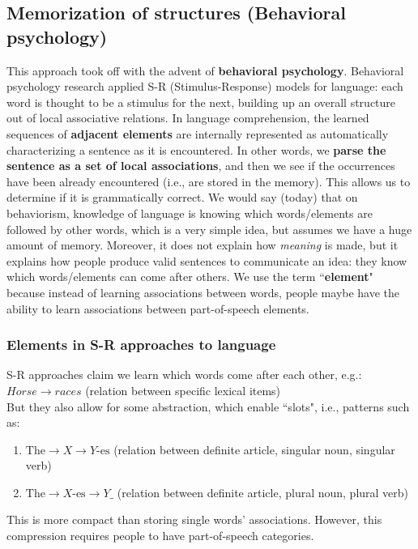 \subsection{Memorization of structures (Behavioral psychology)}
This approach took off with the advent of \textbf{behavioral psychology}.
Behavioral psychology research applied S-R (Stimulus-Response) models for language: each word is thought to be a stimulus for the next, building up an overall structure out of local associative relations.
In language comprehension, the learned sequences of \textbf{adjacent elements} are internally represented as automatically characterizing a sentence as it is encountered. In other words, we \textbf{parse the sentence as a set of local associations}, and then we see if the occurrences have been already encountered (i.e., are stored in the memory). This allows us to determine if it is grammatically correct. We would say (today) that on behaviorism, knowledge of language is 
knowing which words/elements are followed by other words, which is a very simple idea, but assumes we have a huge amount of memory.
Moreover, it does not explain how \textit{meaning} is made, but it explains how people produce valid sentences to communicate an idea: they know which words/elements can come after others.
We use the term ``\textbf{element}" because instead of learning associations between words, people maybe have the ability to learn associations between part-of-speech elements.

\subsubsection{Elements in S-R approaches to language}
S-R approaches claim we learn which words come after each other, e.g.:\\
$Horse \rightarrow races$ (relation between specific lexical items)\\
But they also allow for some abstraction, which enable ``slots", i.e., patterns such as:
\begin{enumerate}
    \item $\text{The} \rightarrow X \rightarrow Y\text{-es}$ (relation between definite article, singular noun, singular verb)
    \item $\text{The} \rightarrow X\text{-es}\rightarrow Y\_$ (relation between definite article, plural noun, plural verb)
\end{enumerate}
This is more compact than storing single words' associations. However, this compression requires people to have part-of-speech categories.

